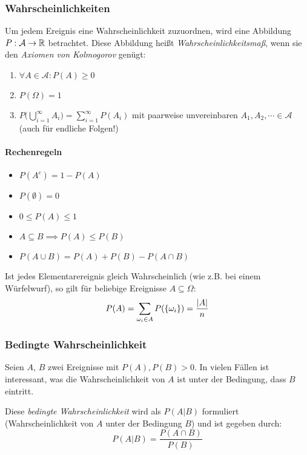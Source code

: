 			\subsubsection{Wahrscheinlichkeiten}
				Um jedem Ereignis eine Wahrscheinlichkeit zuzuordnen, wird eine Abbildung \( P : \mathcal{A} \rightarrow \mathbb{R} \) betrachtet. Diese Abbildung heißt \textit{Wahrscheinlichkeitsmaß}, wenn sie den \textit{Axiomen von Kolmogorov} genügt:
				\begin{enumerate}
					\item \( \forall A \in \mathcal{A} : P(A) \geq 0 \)
					\item \( P(\Omega) = 1 \)
					\item \( P\Big( \bigcup_{i = 1}^\infty A_i \Big) = \sum_{i = 1}^{\infty} P(A_i) \) mit paarweise unvereinbaren \( A_1, A_2, \cdots \in \mathcal{A} \) (auch für endliche Folgen!)
				\end{enumerate}

				\paragraph{Rechenregeln}
					\begin{itemize}
						\item \( P(A^c) = 1 - P(A) \)
						\item \( P(\emptyset) = 0 \)
						\item \( 0 \leq P(A) \leq 1 \)
						\item \( A \subseteq B \implies P(A) \leq P(B) \)
						\item \( P(A \cup B) = P(A) + P(B) - P(A \cap B) \)
					\end{itemize}

					Ist jedes Elementarereignis gleich Wahrscheinlich (wie z.B. bei einem Würfelwurf), so gilt für beliebige Ereignisse \( A \subseteq \Omega \):
					\begin{equation*}
						P(A) = \sum_{\omega_i \in A} P(\{ \omega_i \}) = \frac{\abs{A}}{n}
					\end{equation*}

			\subsubsection{Bedingte Wahrscheinlichkeit}
				Seien \(A\), \(B\) zwei Ereignisse mit \( P(A), P(B) > 0 \). In vielen Fällen ist interessant, was die Wahrscheinlichkeit von \(A\) ist unter der Bedingung, dass \(B\) eintritt.

				Diese \textit{bedingte Wahrscheinlichkeit} wird als \( P(A \vert B) \) formuliert (Wahrscheinlichkeit von \(A\) unter der Bedingung \(B\)) und ist gegeben durch:
				\begin{equation*}
					P(A \vert B) = \frac{P(A \cap B)}{P(B)}
				\end{equation*}


